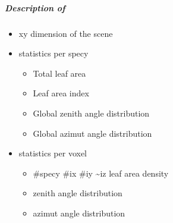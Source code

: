 \documentclass[letterpaper,10pt,english]{sphinxmanual}
\begin{document}
\subparagraph{Description of }
\label{\detokenize{misc_functionnalities:Description-of-fort.60}}\begin{itemize}
\item {} 
\sphinxAtStartPar
xy dimension of the scene

\item {} 
\sphinxAtStartPar
statistics per specy
\begin{itemize}
\item {} 
\sphinxAtStartPar
Total leaf area

\item {} 
\sphinxAtStartPar
Leaf area index

\item {} 
\sphinxAtStartPar
Global zenith angle distribution

\item {} 
\sphinxAtStartPar
Global azimut angle distribution

\end{itemize}

\item {} 
\sphinxAtStartPar
statistics per voxel
\begin{itemize}
\item {} 
\sphinxAtStartPar
\#specy \#ix \#iy \textasciitilde{}iz leaf area density

\item {} 
\sphinxAtStartPar
zenith angle distribution

\item {} 
\sphinxAtStartPar
azimut angle distribution

\end{itemize}

\end{itemize}
\end{document}
